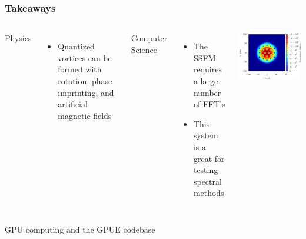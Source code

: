 \documentclass{beamer}
\begin{document}
\begin{frame}
\frametitle{Takeaways}
\begin{columns}
\hspace{0.25cm} 
Physics
\begin{itemize}
\item Quantized vortices can be formed with rotation, phase imprinting, and artificial magnetic fields
\end{itemize}

Computer Science
\begin{itemize}
\item The SSFM requires a large number of FFT's
\item This system is a great for testing spectral methods
\end{itemize}
\hspace{-0.3cm} 
 \includegraphics[width=1\textwidth]{../data/splitop/rot/density_L10.pdf}
\end{columns}

\end{frame}

\begin{frame}
\center \huge GPU computing and the GPUE codebase
\end{frame}
\end{document}
